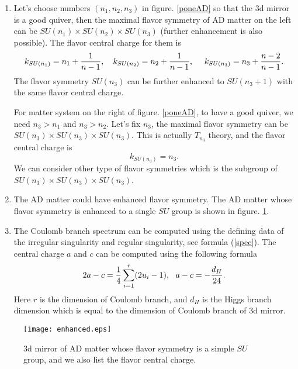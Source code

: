\documentclass[a4paper,11pt]{article}
\begin{document}
\begin{enumerate}
\item Let's choose numbers $(n_1, n_2, n_3)$ in figure. \ref{poneAD} so that the 3d mirror is a good quiver, then the maximal flavor symmetry of AD matter on the left can be $SU(n_1)\times SU(n_2)\times SU(n_3)$ (further enhancement is also possible). The flavor central charge for them is 
\begin{equation}
k_{SU(n_1)}=n_1+{1\over n-1},~~~k_{SU(n_2)}=n_2+{1\over n-1},~~~~k_{SU(n_3)}=n_3+{n-2\over n-1}.
\end{equation}
The flavor symmetry $SU(n_3)$ can be further enhanced to $SU(n_3+1)$ with the same flavor central charge. 

For matter system on the right of figure. \ref{poneAD}, to have a good quiver, we need $n_3>n_1$ and $n_3>n_2$. Let's fix $n_3$, the maximal flavor symmetry can be $SU(n_3)\times SU(n_3)\times SU(n_3)$. This is actually
$T_{n_3}$ theory, and the flavor central charge is 
\begin{equation}
k_{SU(n_3)}=n_3.
\end{equation}
We can consider other type of flavor symmetries which is the subgroup of $SU(n_3)\times SU(n_3)\times SU(n_3)$. 

\item The AD matter could have enhanced flavor symmetry. The AD matter whose  flavor symmetry is enhanced to a single $SU$ group is shown in figure. \ref{enhanced}. 

\item  The Coulomb branch spectrum can be computed using the defining data of the irregular singularity and regular singularity, see formula (\ref{spec}). 
The central charge $a$ and $c$ can be computed using the following formula
\begin{equation}
2a-c={1\over 4}\sum_{i=1}^r(2 u_i-1),~~a-c=-{d_H\over 24}.
\label{central}
\end{equation}
Here $r$ is the dimension of Coulomb branch, and $d_H$ is the Higgs branch dimension which is equal to the dimension of Coulomb branch of 3d mirror.

\end{enumerate}

\begin{figure}[h]
\centering
  \texttt{[image: enhanced.eps]}
  \caption{3d mirror of AD matter whose flavor symmetry is a simple $SU$ group, and we also list the flavor central charge.}
  \label{enhanced}
\end{figure}
\end{document}
